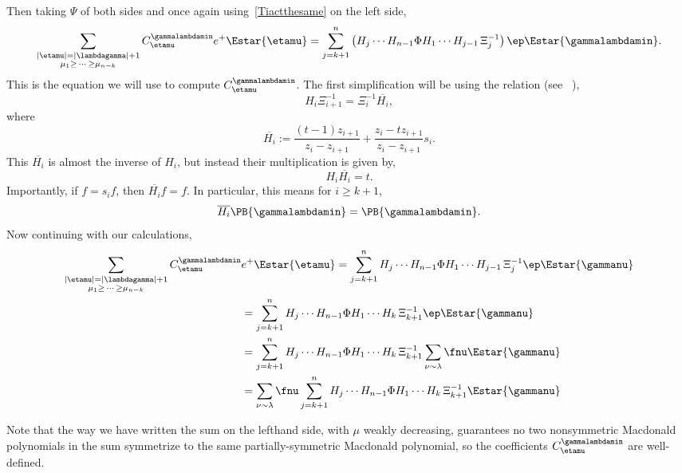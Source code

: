 Then taking $\Psi$ of both sides and once again using~\eqref{Tiactthesame} on the left side,
\begin{equation}\label{bothsides}  \sum_{\substack{|\etamu| = |\lambdagamma| + 1 \\ \mu_1 \geq \, \dotsm \, \geq \mu_{n-k}}}  C^{\gammalambdamin}_{\etamu} e^+ \Estar{\etamu} = \sum_{j=k+1}^n \left( H_j \dotsm H_{n-1} \Phi H_1 \dotsm H_{j-1} \, \Xi_j^{-1} \right) \ep \Estar{\gammalambdamin}.\end{equation}
This is the equation we will use to compute $C_{\etamu}^{\gammalambdamin}$. The first simplification will be using the relation (see ~\cite{MR1456318}),
\[ H_i \Xi_{i+1}^{-1} = \Xi^{-1}_i \overline{H_i},\]
where 
\[\overline{H_i} := \frac{(t-1)z_{i+1}}{z_i-z_{i+1}} + \frac{z_i-tz_{i+1}}{z_i-z_{i+1}} s_i.\]
This $\overline{H_i}$ is almost the inverse of $H_i$, but instead their multiplication is given by,
\[H_i \overline{H_i} = t.\] Importantly, if $f=s_i f$, then $\overline{H_i} f = f$. In particular, this means for $i\geq k+1$,
\[ \overline{H_i} \PB{\gammalambdamin} = \PB{\gammalambdamin}.\]
Now continuing with our calculations,
\begin{align*}
   \sum_{\substack{|\etamu| = |\lambdagamma| + 1 \\ \mu_1 \geq \, \dotsm \, \geq \mu_{n-k}}}  C^{\gammalambdamin}_{\etamu} &e^+ \Estar{\etamu}  =  \sum_{j=k+1}^n  H_j \dotsm H_{n-1} \Phi H_1 \dotsm H_{j-1} \, \Xi_j^{-1} \ep \Estar{\gammanu}\\  
    &=  \sum_{j=k+1}^n  H_j \dotsm H_{n-1} \Phi H_1 \dotsm H_{k} \, \Xi_{k+1}^{-1}  \ep \Estar{\gammanu}\\
    &= \sum_{j=k+1}^n H_j \dotsm H_{n-1} \Phi H_1 \dotsm H_{k} \, \Xi_{k+1}^{-1} \sum_{\nu \sim \lambda} \fnu \Estar{\gammanu} \\
    &=  \sum_{\nu \sim \lambda} \fnu  \sum_{j=k+1}^n H_j \dotsm H_{n-1} \Phi H_1 \dotsm H_{k} \, \Xi_{k+1}^{-1} \Estar{\gammanu}
\end{align*}



Note that the way we have written the sum on the lefthand side, with $\mu$ weakly decreasing, guarantees no two nonsymmetric Macdonald polynomials in the sum symmetrize to the same partially-symmetric Macdonald polynomial, so the coefficients $C_{\etamu}^{\gammalambdamin}$ are well-defined.

